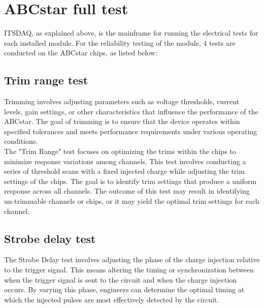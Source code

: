 \section{ABCstar full test}
ITSDAQ, as explained above, is the mainframe for running the electrical tests for each installed module. For the reliability testing of the module, $4$ tests are conducted on the ABCstar chips, as listed below:

\subsection{Trim range test}
Trimming involves adjusting parameters such as voltage thresholds, current levels, gain settings, or other characteristics that influence the performance of the ABCstar. The goal of trimming is to ensure that the device operates within specified tolerances and meets performance requirements under various operating conditions.\\
The "Trim Range" test focuses on optimizing the trims within the chips to minimize response variations among channels. This test involves conducting a series of threshold scans with a fixed injected charge while adjusting the trim settings of the chips. The goal is to identify trim settings that produce a uniform response across all channels. The outcome of this test may result in identifying un-trimmable channels or chips, or it may yield the optimal trim settings for each channel.\cite{ARGOS2019112}

\subsection{Strobe delay test}
The Strobe Delay test involves adjusting the phase of the charge injection relative to the trigger signal. This means altering the timing or synchronization between when the trigger signal is sent to the circuit and when the charge injection occurs. By varying this phase, engineers can determine the optimal timing at which the injected pulses are most effectively detected by the circuit.\cite{ARGOS2019112}

